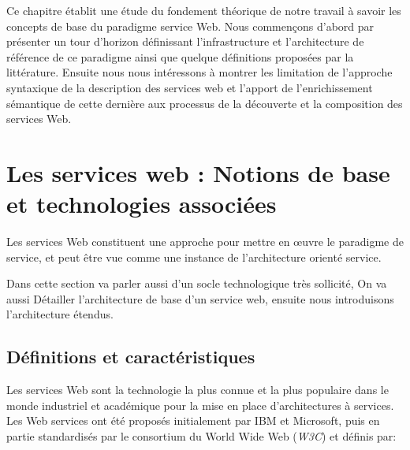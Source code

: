 

    Ce chapitre établit une étude du fondement théorique de notre travail à savoir les concepts de base du paradigme
    service Web.  Nous commençons d'abord par présenter un tour d'horizon définissant l'infrastructure et
    l'architecture de référence de ce paradigme ainsi que quelque définitions proposées par la littérature. Ensuite
    nous nous intéressons à montrer les limitation de l'approche syntaxique de la description des services web et l'apport
    de l'enrichissement sémantique de cette dernière aux processus de la découverte et la composition des services Web.\\

    \newpage
    
\section{Les services web : Notions de base et technologies associées} 
    Les services Web constituent une approche pour mettre en œuvre le paradigme de service, et peut être vue comme
    une instance de l'architecture orienté service.

    Dans cette section va parler aussi d'un socle technologique très sollicité, On va aussi Détailler l'architecture de base 
    d'un service web, ensuite nous introduisons l'architecture étendus.

    \subsection{Définitions et caractéristiques}
	Les services Web sont la technologie la plus connue et la plus populaire dans le monde industriel et
	académique pour la mise en place d’architectures à services. 
	Les Web services ont été proposés initialement par IBM et Microsoft, puis en partie standardisés par le 
	consortium du World Wide Web (\emph{W3C}) et définis \cite{w3c_ws_arch:2014:Misc} par:

